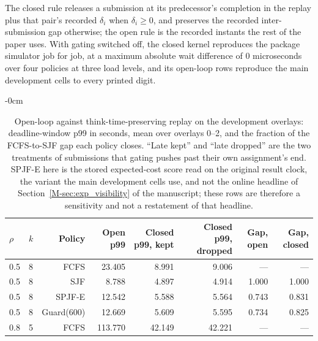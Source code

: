 \documentclass[mathematics,supfile,submit,moreauthors]{Definitions/mdpi}
\newcommand{\devnum}[1]{#1}
\begin{document}
The closed rule releases a submission at its predecessor's completion in the replay plus
that pair's recorded $\delta_i$ when $\delta_i \ge 0$, and preserves the recorded
inter-submission gap otherwise; the open rule is the recorded instants the rest of the
paper uses. With gating switched off, the closed kernel reproduces the package simulator
job for job, at a maximum absolute wait difference of \devnum{0} microseconds over four
policies at three load levels, and its open-loop rows reproduce the main development
cells to every printed digit.

\begin{table}[htbp]
\centering\small
\caption{Open-loop against think-time-preserving replay on the development overlays:
deadline-window p99 in seconds, mean over overlays \devnum{0}--\devnum{2}, and the
fraction of the FCFS-to-SJF gap each policy closes. ``Late kept'' and ``late dropped''
are the two treatments of submissions that gating pushes past their own assignment's
end. SPJF-E here is the stored expected-cost score read on the original result clock,
the variant the main development cells use, and not the online headline of
Section~\ref*{M-sec:exp_visibility} of the manuscript; these rows are therefore a sensitivity and
not a restatement of that headline.}
\label{tab:s_closed}
\begin{adjustwidth}{-\extralength}{0cm}
\centering
\begin{tabular}{llrrrrrr}
\toprule
$\rho$ & $k$ & Policy & Open p99 & Closed p99, kept & Closed p99, dropped & Gap, open & Gap, closed \\
\midrule
\devnum{0.5} & \devnum{8} & FCFS & \devnum{23.405} & \devnum{8.991} & \devnum{9.006} & --- & --- \\
\devnum{0.5} & \devnum{8} & SJF & \devnum{8.788} & \devnum{4.897} & \devnum{4.914} & \devnum{1.000} & \devnum{1.000} \\
\devnum{0.5} & \devnum{8} & SPJF-E & \devnum{12.542} & \devnum{5.588} & \devnum{5.564} & \devnum{0.743} & \devnum{0.831} \\
\devnum{0.5} & \devnum{8} & Guard(\devnum{600}) & \devnum{12.669} & \devnum{5.609} & \devnum{5.595} & \devnum{0.734} & \devnum{0.825} \\
\midrule
\devnum{0.8} & \devnum{5} & FCFS & \devnum{113.770} & \devnum{42.149} & \devnum{42.221} & --- & --- \\

\end{tabular}
\end{adjustwidth}
\end{table}
\end{document}
